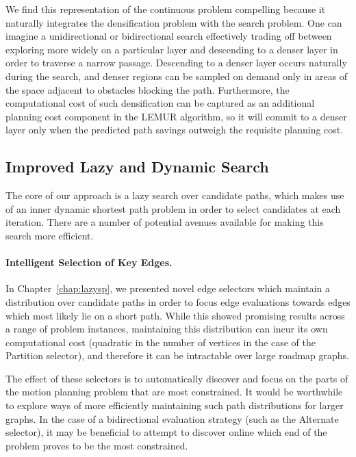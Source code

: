 We find this representation of the continuous problem compelling
because it naturally integrates the densification problem with
the search problem.
One can imagine a unidirectional or bidirectional search
effectively trading off between
exploring more widely on a particular layer
and descending to a denser layer in order to traverse a narrow passage.
Descending to a denser layer occurs naturally during the search,
and denser regions can be sampled on demand only in areas of the space
adjacent to obstacles blocking the path.
Furthermore,
the computational cost of such densification can be captured as
an additional planning cost component in the LEMUR algorithm,
so it will commit to a denser layer only when the predicted path
savings outweigh the requisite planning cost.

\subsection{Improved Lazy and Dynamic Search}

The core of our approach is a lazy search over candidate paths,
which makes use of an inner dynamic shortest path problem
in order to select candidates at each iteration.
There are a number of potential avenues available for making this
search more efficient.

\paragraph{Intelligent Selection of Key Edges.}
In Chapter~\ref{chap:lazysp},
we presented novel edge selectors which maintain a distribution over
candidate paths
in order to focus edge evaluations towards edges which most likely
lie on a short path.
While this showed promising results across a range of problem instances,
maintaining this distribution can incur its own computational cost
(quadratic in the number of vertices in the case of the Partition
selector),
and therefore it can be intractable over large roadmap graphs.

The effect of these selectors is to automatically discover
and focus on the parts of the motion planning problem that are
most constrained.
It would be worthwhile to explore ways of more efficiently maintaining
such path distributions for larger graphs.
In the case of a bidirectional evaluation strategy
(such as the Alternate selector),
it may be beneficial to attempt to discover online which end
of the problem proves to be the most constrained.

